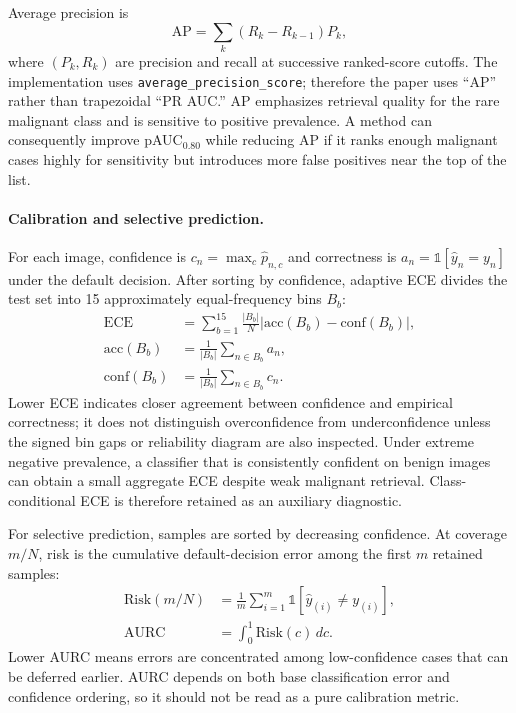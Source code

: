 \documentclass[letterpaper]{article}
\begin{document}
Average precision is
\begin{equation}\label{eq:appendix_ap}
\mathrm{AP}=\sum_{k}(R_k-R_{k-1})P_k,
\end{equation}
where $(P_k,R_k)$ are precision and recall at successive ranked-score cutoffs.
The implementation uses \texttt{average\_precision\_score}; therefore the paper
uses ``AP'' rather than trapezoidal ``PR AUC.'' AP emphasizes retrieval quality
for the rare malignant class and is sensitive to positive prevalence. A method
can consequently improve pAUC$_{0.80}$ while reducing AP if it ranks enough
malignant cases highly for sensitivity but introduces more false positives near
the top of the list.

\paragraph{Calibration and selective prediction.}
For each image, confidence is $c_n=\max_c\hat p_{n,c}$ and correctness is
$a_n=\mathbb 1[\hat y_n=y_n]$ under the default decision. After sorting by
confidence, adaptive ECE divides the test set into 15 approximately
equal-frequency bins $B_b$:
\begin{equation}\label{eq:appendix_ece}
\begin{aligned}
\mathrm{ECE}&=\sum_{b=1}^{15}\frac{|B_b|}{N}
\left|\mathrm{acc}(B_b)-\mathrm{conf}(B_b)\right|,\\
\mathrm{acc}(B_b)&=\frac{1}{|B_b|}\sum_{n\in B_b}a_n,\\
\mathrm{conf}(B_b)&=\frac{1}{|B_b|}\sum_{n\in B_b}c_n.
\end{aligned}
\end{equation}
Lower ECE indicates closer agreement between confidence and empirical
correctness; it does not distinguish overconfidence from underconfidence unless
the signed bin gaps or reliability diagram are also inspected. Under extreme
negative prevalence, a classifier that is consistently confident on benign
images can obtain a small aggregate ECE despite weak malignant retrieval.
Class-conditional ECE is therefore retained as an auxiliary diagnostic.

For selective prediction, samples are sorted by decreasing confidence. At
coverage $m/N$, risk is the cumulative default-decision error among the first
$m$ retained samples:
\begin{equation}\label{eq:appendix_aurc}
\begin{aligned}
\mathrm{Risk}(m/N)&=\frac{1}{m}\sum_{i=1}^{m}
\mathbb 1[\hat y_{(i)}\ne y_{(i)}],\\
\mathrm{AURC}&=\int_0^1\mathrm{Risk}(c)\,dc.
\end{aligned}
\end{equation}
Lower AURC means errors are concentrated among low-confidence cases that can be
deferred earlier. AURC depends on both base classification error and confidence
ordering, so it should not be read as a pure calibration metric.
\end{document}
